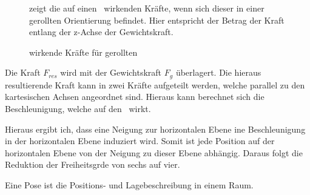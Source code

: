 \begin{figure}[ht!]
\vspace{0.25cm}
\begin{center}
\caption{wirkende Kräfte für gerollten \Quad\ }
\label{fig:ForcesRolled}
\end{center}

\vspace{0.25cm}
 zeigt die auf einen \Quad\ wirkenden Kräfte, wenn sich dieser in einer gerollten Orientierung befindet. Hier entspricht der Betrag der Kraft entlang der z-Achse der Gewichtskraft.
\end{figure}


Die Kraft $F_{res}$ wird mit der Gewichtskraft $F_g$ überlagert. Die hieraus resultierende Kraft kann in zwei Kräfte aufgeteilt werden, welche parallel zu den kartesischen Achsen angeordnet sind. Hieraus kann berechnet sich die Beschleunigung, welche auf den \Quad\ wirkt.





Hieraus ergibt ich, dass eine Neigung zur horizontalen Ebene ine Beschleunigung in der horizontalen Ebene induziert wird. Somit ist jede Position auf der horizontalen Ebene von der Neigung zu dieser Ebene abhängig. Daraus folgt die Reduktion der Freiheitsgrde von sechs auf vier.










Eine Pose ist die Positions- und Lagebeschreibung in einem Raum. \missing[quelle]










\missing



\missing










